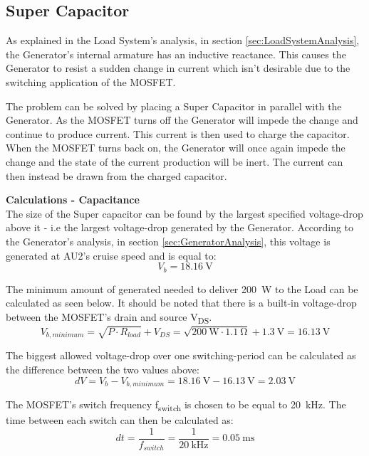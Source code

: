\subsection{Super Capacitor}
As explained in the Load System's analysis, in section \vref{sec:LoadSystemAnalysis}, the Generator's internal armature has an inductive reactance. This causes the Generator to resist a sudden change in current which isn't desirable due to the switching application of the MOSFET.

The problem can be solved by placing a Super Capacitor in parallel with the Generator. As the MOSFET turns off the Generator will impede the change and continue to produce current. This current is then used to charge the capacitor. When the MOSFET turns back on, the Generator will once again impede the change and the state of the current production will be inert. The current can then instead be drawn from the charged capacitor.


\textbf{Calculations - Capacitance}\\
The size of the Super capacitor can be found by the largest specified voltage-drop above it - i.e the largest voltage-drop generated by the Generator. According to the Generator's analysis, in section \vref{sec:GeneratorAnalysis}, this voltage is generated at AU2's cruise speed and is equal to:
\begin{equation}
	V_b = \SI{18.16}{\volt}
\end{equation}

The minimum amount of generated needed to deliver \SI{200}{\watt} to the Load can be calculated as seen below. It should be noted that there is a built-in voltage-drop between the MOSFET's drain and source V\textsubscript{DS}\cite{IRFP260N}.
\begin{equation}
	V_{b,minimum} = \sqrt{P \cdot R_{load}} + V_{DS}= \sqrt{\SI{200}{\watt} \cdot \SI{1.1}{\ohm}} + \SI{1.3}{\volt}= \SI{16.13}{\volt}
\end{equation}

\newpage
The biggest allowed voltage-drop over one switching-period can be calculated as the difference between the two values above:
\begin{equation}
	dV = V_b - V_{b,minimum} = \SI{18.16}{\volt} - \SI{16.13}{\volt} = \SI{2.03}{\volt}
\end{equation}
 
The MOSFET's switch frequency f\textsubscript{switch} is chosen to be equal to \SI{20}{\kilo \hertz}. The time between each switch can then be calculated as:
\begin{equation}
	dt = \frac{1}{f_{switch}} = \frac{1}{\SI{20}{\kilo \hertz}} = \SI{0.05}{\milli \second}
\end{equation}

